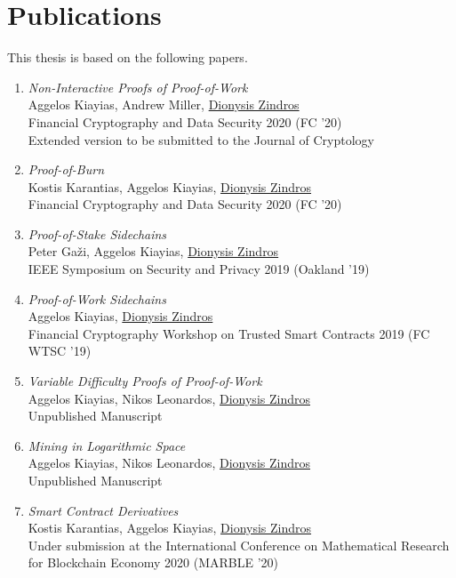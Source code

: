 \section*{Publications}

This thesis is based on the following papers.

\begin{enumerate}
  \item
    \emph{Non-Interactive Proofs of Proof-of-Work}\\
    Aggelos Kiayias, Andrew Miller, \underline{Dionysis Zindros}\\
    Financial Cryptography and Data Security 2020 (FC '20)\\
    Extended version to be submitted to the Journal of Cryptology
  \item
    \emph{Proof-of-Burn}\\
    Kostis Karantias, Aggelos Kiayias, \underline{Dionysis Zindros}\\
    Financial Cryptography and Data Security 2020 (FC '20)
  \item
    \emph{Proof-of-Stake Sidechains}\\
    Peter Ga\v{z}i, Aggelos Kiayias, \underline{Dionysis Zindros}\\
    IEEE Symposium on Security and Privacy 2019 (Oakland '19)
  \item
    \emph{Proof-of-Work Sidechains}\\
    Aggelos Kiayias, \underline{Dionysis Zindros}\\
    Financial Cryptography Workshop on Trusted Smart Contracts 2019 (FC WTSC '19)
  \item
    \emph{Variable Difficulty Proofs of Proof-of-Work}\\
    Aggelos Kiayias, Nikos Leonardos, \underline{Dionysis Zindros}\\
    Unpublished Manuscript
  \item
    \emph{Mining in Logarithmic Space}\\
    Aggelos Kiayias, Nikos Leonardos, \underline{Dionysis Zindros}\\
    Unpublished Manuscript
  \item
    \emph{Smart Contract Derivatives}\\
    Kostis Karantias, Aggelos Kiayias, \underline{Dionysis Zindros}\\
    Under submission at the
    International Conference on Mathematical Research for Blockchain Economy 2020 (MARBLE '20)\\
\end{enumerate}


